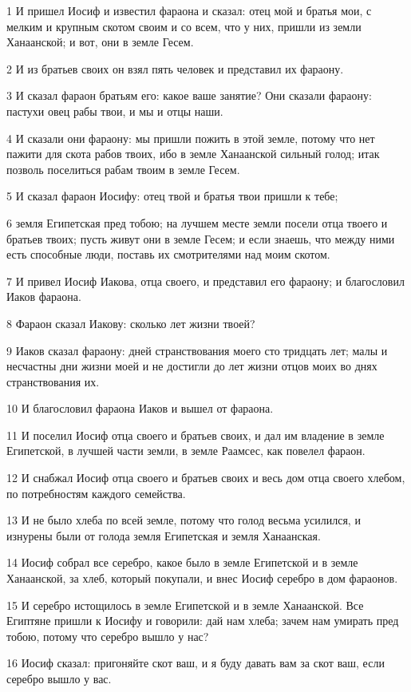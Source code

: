 \par 1 И пришел Иосиф и известил фараона и сказал: отец мой и братья мои, с мелким и крупным скотом своим и со всем, что у них, пришли из земли Ханаанской; и вот, они в земле Гесем.
\par 2 И из братьев своих он взял пять человек и представил их фараону.
\par 3 И сказал фараон братьям его: какое ваше занятие? Они сказали фараону: пастухи овец рабы твои, и мы и отцы наши.
\par 4 И сказали они фараону: мы пришли пожить в этой земле, потому что нет пажити для скота рабов твоих, ибо в земле Ханаанской сильный голод; итак позволь поселиться рабам твоим в земле Гесем.
\par 5 И сказал фараон Иосифу: отец твой и братья твои пришли к тебе;
\par 6 земля Египетская пред тобою; на лучшем месте земли посели отца твоего и братьев твоих; пусть живут они в земле Гесем; и если знаешь, что между ними есть способные люди, поставь их смотрителями над моим скотом.
\par 7 И привел Иосиф Иакова, отца своего, и представил его фараону; и благословил Иаков фараона.
\par 8 Фараон сказал Иакову: сколько лет жизни твоей?
\par 9 Иаков сказал фараону: дней странствования моего сто тридцать лет; малы и несчастны дни жизни моей и не достигли до лет жизни отцов моих во днях странствования их.
\par 10 И благословил фараона Иаков и вышел от фараона.
\par 11 И поселил Иосиф отца своего и братьев своих, и дал им владение в земле Египетской, в лучшей части земли, в земле Раамсес, как повелел фараон.
\par 12 И снабжал Иосиф отца своего и братьев своих и весь дом отца своего хлебом, по потребностям каждого семейства.
\par 13 И не было хлеба по всей земле, потому что голод весьма усилился, и изнурены были от голода земля Египетская и земля Ханаанская.
\par 14 Иосиф собрал все серебро, какое было в земле Египетской и в земле Ханаанской, за хлеб, который покупали, и внес Иосиф серебро в дом фараонов.
\par 15 И серебро истощилось в земле Египетской и в земле Ханаанской. Все Египтяне пришли к Иосифу и говорили: дай нам хлеба; зачем нам умирать пред тобою, потому что серебро вышло у нас?
\par 16 Иосиф сказал: пригоняйте скот ваш, и я буду давать вам за скот ваш, если серебро вышло у вас.

